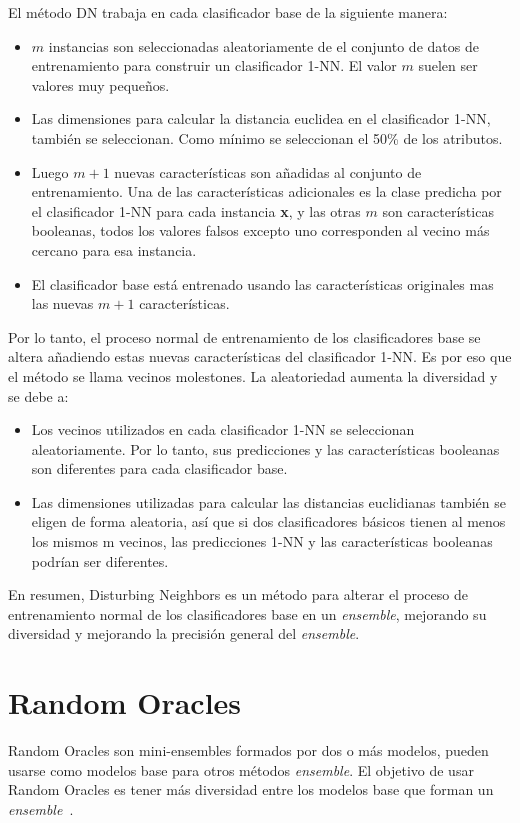 El método DN trabaja en cada clasificador base de la siguiente manera:
\begin{itemize}
    \item $m$ instancias son seleccionadas aleatoriamente de el conjunto de datos de entrenamiento para construir un clasificador 1-NN. El valor $m$ suelen ser valores muy pequeños.
    \item Las dimensiones para calcular la distancia euclidea en el clasificador 1-NN, también se seleccionan. Como mínimo se seleccionan el 50\% de los atributos.
    \item Luego $m+1$ nuevas características son añadidas al conjunto de entrenamiento. Una de las características adicionales es la clase predicha por el clasificador 1-NN para cada instancia \textbf{x}, y las otras $m$ son características booleanas, todos los valores falsos excepto uno corresponden al vecino más cercano para esa instancia.
    \item El clasificador base está entrenado usando las características originales mas las nuevas $m+1$ características. 
\end{itemize}
Por lo tanto, el proceso normal de entrenamiento de los clasificadores base se altera añadiendo estas nuevas características del clasificador 1-NN. Es por eso que el método se llama vecinos molestones. La aleatoriedad aumenta la diversidad y se debe a:
\begin{itemize}
\item Los vecinos utilizados en cada clasificador 1-NN se seleccionan aleatoriamente. Por lo tanto, sus predicciones y las características booleanas son diferentes para cada clasificador base.
\item Las dimensiones utilizadas para calcular las distancias euclidianas también se eligen de forma aleatoria, así que si dos clasificadores básicos tienen al menos los mismos m vecinos, las predicciones 1-NN y las características booleanas podrían ser diferentes.
\end{itemize}

En resumen, Disturbing Neighbors es un método para alterar el proceso de entrenamiento normal de los clasificadores base en un \textit{ensemble}, mejorando su diversidad y mejorando la precisión general del \textit{ensemble}.

\section{Random Oracles}

Random Oracles son mini-ensembles formados por dos o más modelos, pueden usarse como modelos base para otros métodos \textit{ensemble}. El objetivo de usar Random Oracles es tener más diversidad entre los modelos base que forman un \textit{ensemble}~\cite{randomoracles}.

